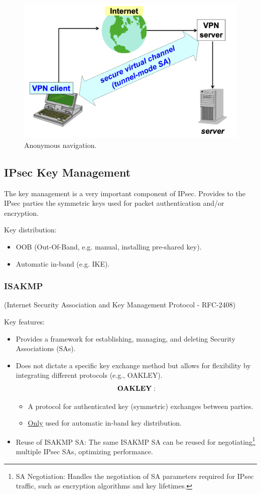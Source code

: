 \begin{figure}[H]
  \includegraphics[width=\linewidth]{Images/NetSec/anonnav.png}
  \caption{Anonymous navigation.}
  \label{fig:anonnav}
\end{figure}

\subsection{IPsec Key Management}
The key management is a very important component of IPsec. Provides to the IPsec parties the symmetric keys used for packet authentication and/or encryption.

Key distribution:
\begin{itemize}
    \item OOB (Out-Of-Band, e.g. manual, installing pre-shared key).
    \item Automatic in-band (e.g. IKE).
\end{itemize}

\subsubsection{ISAKMP}
\begin{center}
    (Internet Security Association and Key Management Protocol - RFC-2408)
\end{center}

Key features:
\begin{itemize}
    \item Provides a framework for establishing, managing, and deleting Security Associations (SAs).
    \item Does not dictate a specific key exchange method but allows for flexibility by integrating different protocols (e.g., OAKLEY).
    \[\bf{OAKLEY:}\]
    \begin{itemize}
        \item A protocol for authenticated key (symmetric) exchanges between parties.
        \item \underline{Only} used for automatic in-band key distribution.
    \end{itemize}
    \item Reuse of ISAKMP SA: The same ISAKMP SA can be reused for negotiating\footnote{SA Negotiation: Handles the negotiation of SA parameters required for IPsec traffic, such as encryption algorithms and key lifetimes.} multiple IPsec SAs, optimizing performance.
\end{itemize}

